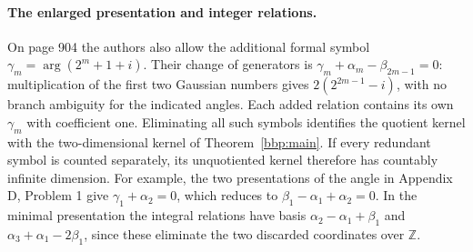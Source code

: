 \documentclass[11pt]{article}
\begin{document}
\paragraph{The enlarged presentation and integer relations.}
On page 904 the authors also allow the additional formal symbol
$\gamma_m=\arg(2^m+1+i)$. Their change of generators is
$\gamma_m+\alpha_m-\beta_{2m-1}=0$: multiplication of the first two Gaussian numbers gives $2(2^{2m-1}-i)$, with no branch ambiguity for the indicated angles. Each added relation contains its own $\gamma_m$ with coefficient one. Eliminating all such symbols identifies the quotient kernel with the two-dimensional kernel of Theorem~\ref{bbp:main}. If every redundant symbol is counted separately, its unquotiented kernel therefore has countably infinite dimension. For example, the two presentations of the angle in Appendix D, Problem 1 give $\gamma_1+\alpha_2=0$, which reduces to $\beta_1-\alpha_1+\alpha_2=0$. In the minimal presentation the integral relations have basis $\alpha_2-\alpha_1+\beta_1$ and $\alpha_3+\alpha_1-2\beta_1$, since these eliminate the two discarded coordinates over $\mathbb Z$.
\end{document}
